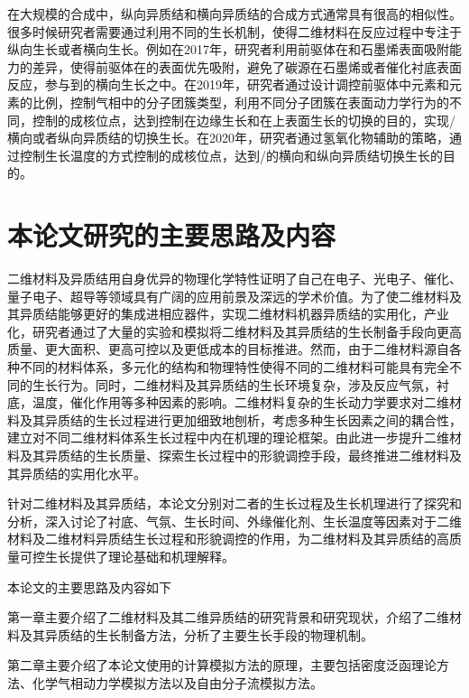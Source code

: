     在大规模的合成中，纵向异质结和横向异质结的合成方式通常具有很高的相似性。很多时候研究者需要通过利用不同的生长机制，使得二维材料在反应过程中专注于纵向生长或者横向生长。例如在2017年，研究者利用前驱体在和石墨烯表面吸附能力的差异，使得前驱体在的表面优先吸附，避免了碳源在石墨烯或者催化衬底表面反应，参与到的横向生长之中。在2019年，研究者通过设计调控前驱体中元素和元素的比例，控制气相中的分子团簇类型，利用不同分子团簇在表面动力学行为的不同，控制的成核位点，达到控制在边缘生长和在上表面生长的切换的目的，实现/横向或者纵向异质结的切换生长。在2020年，研究者通过氢氧化物辅助的策略，通过控制生长温度的方式控制的成核位点，达到/的横向和纵向异质结切换生长的目的。
\section{本论文研究的主要思路及内容}
    二维材料及异质结用自身优异的物理化学特性证明了自己在电子、光电子、催化、量子电子、超导等领域具有广阔的应用前景及深远的学术价值。为了使二维材料及其异质结能够更好的集成进相应器件，实现二维材料机器异质结的实用化，产业化，研究者通过了大量的实验和模拟将二维材料及其异质结的生长制备手段向更高质量、更大面积、更高可控以及更低成本的目标推进。然而，由于二维材料源自各种不同的材料体系，多元化的结构和物理特性使得不同的二维材料可能具有完全不同的生长行为。同时，二维材料及其异质结的生长环境复杂，涉及反应气氛，衬底，温度，催化作用等多种因素的影响。二维材料复杂的生长动力学要求对二维材料及其异质结的生长过程进行更加细致地刨析，考虑多种生长因素之间的耦合性，建立对不同二维材料体系生长过程中内在机理的理论框架。由此进一步提升二维材料及其异质结的生长质量、探索生长过程中的形貌调控手段，最终推进二维材料及其异质结的实用化水平。

    针对二维材料及其异质结，本论文分别对二者的生长过程及生长机理进行了探究和分析，深入讨论了衬底、气氛、生长时间、外缘催化剂、生长温度等因素对于二维材料及二维材料异质结生长过程和形貌调控的作用，为二维材料及其异质结的高质量可控生长提供了理论基础和机理解释。

    本论文的主要思路及内容如下\chinesecolon

    第一章主要介绍了二维材料及其二维异质结的研究背景和研究现状，介绍了二维材料及其异质结的生长制备方法，分析了主要生长手段的物理机制。

    第二章主要介绍了本论文使用的计算模拟方法的原理，主要包括密度泛函理论方法、化学气相动力学模拟方法以及自由分子流模拟方法。

